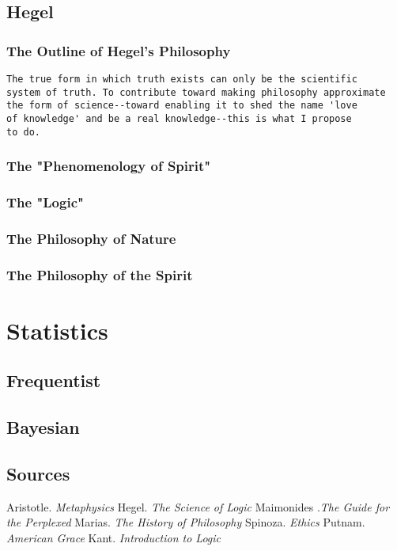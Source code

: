 \documentclass[a4paper,11pt]{article}
\begin{document}
\subsection{Hegel}
\subsubsection{The Outline of Hegel's Philosophy}

\begin{verbatim}
The true form in which truth exists can only be the scientific
system of truth. To contribute toward making philosophy approximate
the form of science--toward enabling it to shed the name 'love
of knowledge' and be a real knowledge--this is what I propose
to do.
\end{verbatim}


\subsubsection{The "Phenomenology of Spirit"}
\subsubsection{The "Logic"}
\subsubsection{The Philosophy of Nature}
\subsubsection{The Philosophy of the Spirit}
\section{Statistics}
\subsection{Frequentist}
\subsection{Bayesian}

\subsection{Sources}
Aristotle. \emph{Metaphysics}
Hegel. \emph{The Science of Logic}
Maimonides .\emph{The Guide for the Perplexed}
Marias. \emph{The History of Philosophy}
Spinoza. \emph{Ethics}
Putnam. \emph{American Grace}
Kant. \emph{Introduction to Logic}
\end{document}

